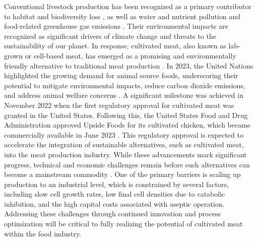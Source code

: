 \documentclass[final,3p,times,twocolumn,authoryear]{elsarticle}
\theoremstyle{definition}
\begin{document}
Conventional livestock production has been recognized as a primary contributor to habitat and biodiversity loss \citep{Machovina2015,Zabel2019}, as well as water and nutrient pollution \citep{Poore2018} and food-related greenhouse gas emissions \citep{Poore2018,Xu2021}. Their environmental impacts are recognized as significant drivers of climate change and threats to the sustainability of our planet. In response, cultivated meat, also known as lab-grown or cell-based meat, has emerged as a promising and environmentally friendly alternative to traditional meat production \citep{Santo2020}. In 2023, the United Nations highlighted the growing demand for animal source foods, underscoring their potential to mitigate environmental impacts, reduce carbon dioxide emissions, and address animal welfare concerns \citep{UN2023}. A significant milestone was achieved in November 2022 when the first regulatory approval for cultivated meat was granted in the United States. Following this, the United States Food and Drug Administration approved Upside Foods for its cultivated chicken, which became commercially available in June 2023 \citep{FDA2023}. This regulatory approval is expected to accelerate the integration of sustainable alternatives, such as cultivated meat, into the meat production industry. While these advancements mark significant progress, technical and economic challenges remain before such alternatives can become a mainstream commodity \citep{Humbird2021}. One of the primary barriers is scaling up production to an industrial level, which is constrained by several factors, including slow cell growth rates, low final cell densities due to catabolic inhibition, and the high capital costs associated with aseptic operation. Addressing these challenges through continued innovation and process optimization will be critical to fully realizing the potential of cultivated meat within the food industry.
\end{document}
